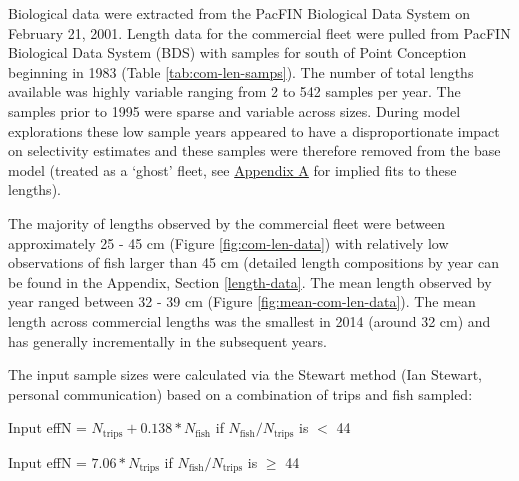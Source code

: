 \documentclass[11pt,
  english,
  a4paper,
]{article}
\begin{document}
Biological data were extracted from the PacFIN Biological Data System on February 21, 2001. Length data for the commercial fleet were pulled from PacFIN Biological Data System (BDS) with samples for south of Point Conception beginning in 1983 (Table \ref{tab:com-len-samps}). The number of total lengths available was highly variable ranging from 2 to 542 samples per year. The samples prior to 1995 were sparse and variable across sizes. During model explorations these low sample years appeared to have a disproportionate impact on selectivity estimates and these samples were therefore removed from the base model (treated as a `ghost' fleet, see {\protect\hyperlink{append_a}{Appendix A}\leavevmode\tagmcend\tagstructend} for implied fits to these lengths).

\leavevmode\tagmcend\tagstructend\par


The majority of lengths observed by the commercial fleet were between approximately 25 - 45 cm (Figure \ref{fig:com-len-data}) with relatively low observations of fish larger than 45 cm (detailed length compositions by year can be found in the Appendix, Section \ref{length-data}. The mean length observed by year ranged between 32 - 39 cm (Figure \ref{fig:mean-com-len-data}). The mean length across commercial lengths was the smallest in 2014 (around 32 cm) and has generally incrementally in the subsequent years.

\leavevmode\tagmcend\tagstructend\par


The input sample sizes were calculated via the Stewart method (Ian Stewart, personal communication) based on a combination of trips and fish sampled:

\leavevmode\tagmcend\tagstructend\par

\begin{centering}

Input effN = $N_{\text{trips}} + 0.138 * N_{\text{fish}}$ if $N_{\text{fish}}/N_{\text{trips}}$ is $<$ 44

Input effN = $7.06 * N_{\text{trips}}$ if $N_{\text{fish}}/N_{\text{trips}}$ is $\geq$ 44

\end{centering}

\end{document}
